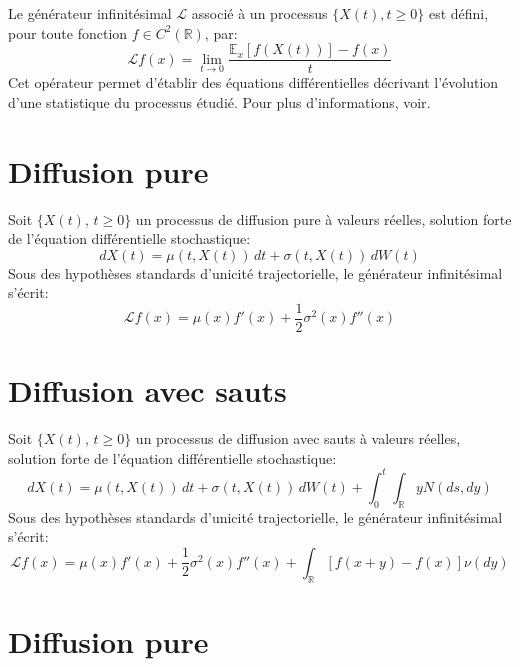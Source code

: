 \label{infinitesimal_generator}

Le générateur infinitésimal \( \mathcal{L} \) associé à un processus \( \{X(t), t\geq0\} \) est défini, pour toute fonction \( f \in C^2(\mathds{R}) \), par:
\[
    \mathcal{L}f(x) = \lim_{t \to 0} \frac{\mathds{E}_x[f(X(t))] - f(x)}{t}
\]
Cet opérateur permet d'établir des équations différentielles décrivant l'évolution d'une statistique du processus étudié. Pour plus d'informations, voir\cite{bakry2014}.

\section*{Diffusion pure}

Soit \( \{X(t),\, t \geq 0\} \) un processus de diffusion pure à valeurs réelles, solution forte de l'équation différentielle stochastique:
\[
    dX(t) = \mu(t,X(t))\,dt + \sigma(t,X(t))\,dW(t)
\]
Sous des hypothèses standards d'unicité trajectorielle, le générateur infinitésimal s'écrit:
\[
    \mathcal{L}f(x) = \mu(x) f'(x) + \frac{1}{2} \sigma^2(x) f''(x)
\]

\section*{Diffusion avec sauts}

Soit \( \{X(t),\, t \geq 0\} \) un processus de diffusion avec sauts à valeurs réelles, solution forte de l'équation différentielle stochastique:
\[
    dX(t) = \mu(t, X(t))\,dt + \sigma(t, X(t))\,dW(t) + \int_0^t\int_{\mathds{R}} yN(ds,dy)
\]
Sous des hypothèses standards d'unicité trajectorielle, le générateur infinitésimal s'écrit:
\[
    \mathcal{L}f(x) = \mu(x) f'(x) + \frac{1}{2} \sigma^2(x) f''(x) + \int_{\mathds{R}} \left[f(x+y) - f(x)\right] \nu(dy)
\]

\label{trajecotry_uniqueness}

\section*{Diffusion pure}

